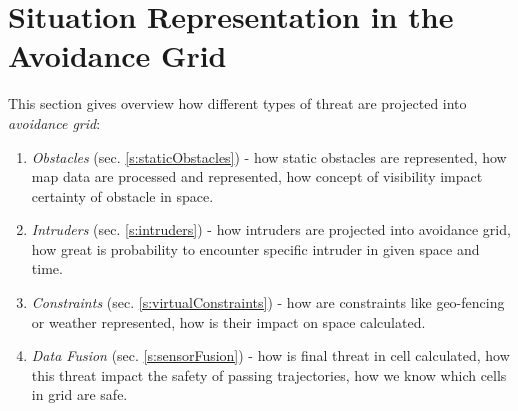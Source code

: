 \cleardoublepage
\section{Situation Representation in the Avoidance Grid}\label{sec:situationAssessment}
\noindent This section gives overview how different types of threat are projected into \emph{avoidance grid}:

\begin{enumerate}
	\item\emph{Obstacles} (sec. \ref{s:staticObstacles}) - how static obstacles are represented, how map data are processed and represented, how concept of visibility impact certainty of obstacle in space.
	
	\item\emph{Intruders} (sec. \ref{s:intruders}) - how intruders are projected into avoidance grid, how great is probability to encounter specific intruder in given space and time.
	
	\item\emph{Constraints} (sec. \ref{s:virtualConstraints}) - how are constraints like geo-fencing or weather represented, how is their impact on space calculated.
	
	\item\emph{Data Fusion} (sec. \ref{s:sensorFusion}) - how is final threat in cell calculated, how this threat impact the safety of passing trajectories, how we know which cells in grid are safe.
\end{enumerate}
